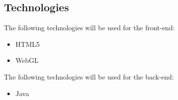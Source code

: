 \documentclass[a4paper,12pt]{article}
\begin{document}
\subsection{Technologies}
The following technologies will be used for the front-end:
\begin{itemize}
\item HTML5
\item WebGL
\end{itemize}
The following technologies will be used for the back-end:
\begin{itemize}
\item Java
\end{itemize}
\end{document}
